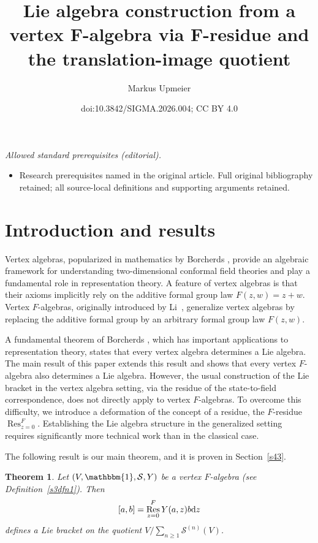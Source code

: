 \documentclass[10pt,a4paper]{amsart}
\title{Lie algebra construction from a vertex F-algebra via F-residue and the translation-image quotient}
\author{Markus Upmeier}
\date{doi:10.3842/SIGMA.2026.004; CC BY 4.0}
\numberwithin{equation}{section}
\newtheorem*{Theorem*}{Theorem}
\theoremstyle{definition}
\DeclareMathOperator\Res{Res}
\begin{document}
\maketitle
\noindent\textit{Allowed standard prerequisites (editorial).}\begin{itemize}
\item Research prerequisites named in the original article. Full original bibliography retained; all source-local definitions and supporting arguments retained.
\end{itemize}\medskip
\section{Introduction and results}
\label{s1}

Vertex algebras, popularized in mathematics by Borcherds \cite{Borc}, provide an algebraic framework for understanding two-dimensional conformal field theories and play a fundamental role in representation theory. A feature of vertex algebras is that their axioms implicitly rely on the additive formal group law $F(z,w)=z+w$. Vertex $F$-algebras, originally introduced by Li~\cite{Li}, generalize vertex algebras by replacing the additive formal group by an arbitrary formal group law $F(z,w)$.

A fundamental theorem of Borcherds \cite{Borc}, which has important applications to representation theory, states that every vertex algebra determines a Lie algebra. The main result of this paper extends this result and shows that every vertex $F$-algebra also determines a Lie algebra. However, the usual construction of the Lie bracket in the vertex algebra setting, via the residue of the state-to-field correspondence, does not directly apply to vertex $F$-algebras. To overcome this difficulty, we introduce a deformation of the concept of a residue, the $F$-residue $\Res_{z=0}^F$. Establishing the Lie algebra structure in the generalized setting requires significantly more technical work than in the classical case.

The following result is our main theorem, and it is proven in Section~\ref{s43}.

\begin{Theorem*}
Let $(V,\mathbbm{1},\mathcal{S},Y)$ be a vertex $F$-algebra \textup(see Definition~\textup{\ref{s3dfn1}}\textup). Then
\[
 [a,b] = \Res_{z=0}^F Y(a,z)b {\rm d}z
\]
defines a Lie bracket on the quotient $V/\sum_{n\geqslant1}\mathcal{S}^{(n)}(V)$.
\end{Theorem*}
\end{document}
